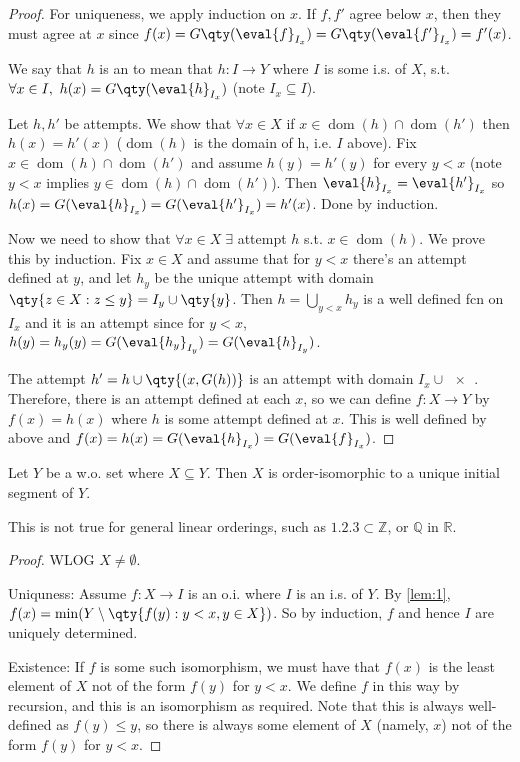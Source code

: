 \begin{proof}
    For uniqueness, we apply induction on $x$.
    If $f, f'$ agree below $x$, then they must agree at $x$ since $f(x) = G\qty(\eval{f}_{I_x}) = G\qty(\eval{f'}_{I_x}) = f'(x)$.

    We say that $h$ is an  to mean that $h \colon I \to Y$ where $I$ is some i.s. of $X$, s.t. $\forall x \in I,\ h(x) = G\qty(\eval{h}_{I_x})$ (note $I_x \subseteq I$).

    Let $h, h'$ be attempts.
    We show that $\forall x \in X$ if $x \in \operatorname{dom}(h) \cap \operatorname{dom}(h')$ then $h(x) = h'(x)$ ($\operatorname{dom}(h)$ is the domain of h, i.e. $I$ above).
    Fix $x \in \operatorname{dom}(h) \cap \operatorname{dom}(h')$ and assume $h(y) = h'(y)$ for every $y < x$ (note $y < x$ implies $y \in \operatorname{dom}(h) \cap \operatorname{dom}(h')$).
    Then $\eval{h}_{I_x} = \eval{h'}_{I_x}$ so $h(x) = G(\eval{h}_{I_x}) = G(\eval{h'}_{I_x}) = h'(x)$.
    Done by induction.

    Now we need to show that $\forall x \in X \; \exists$ attempt $h$ s.t. $x \in \operatorname{dom}(h)$.
    We prove this by induction.
    Fix $x \in X$ and assume that for $y < x$ there's an attempt defined at $y$, and let $h_y$ be the unique attempt with domain $\qty{z \in X : z \leq y} = I_y \cup \qty{y}$.
    Then $h = \bigcup_{y < x} h_y$ is a well defined fcn on $I_x$ and it is an attempt since for $y < x$, $h(y) = h_y(y) = G(\eval{h_y}_{I_y}) = G(\eval{h}_{I_y})$.

    The attempt $h' = h \cup \qty{(x, G(h))}$ is an attempt with domain $I_x \cup \qty{x}$.
    Therefore, there is an attempt defined at each $x$, so we can define $f \colon X \to Y$ by $f(x) = h(x)$ where $h$ is some attempt defined at $x$.
    This is well defined by above and $f(x) = h(x) = G(\eval{h}_{I_x}) = G(\eval{f}_{I_x})$.
\end{proof}

\begin{proposition} \label{prp:sbs}
    Let $Y$ be a w.o. set where $X \subseteq Y$.
    Then $X$ is order-isomorphic to a unique initial segment of $Y$.
\end{proposition}
This is not true for general linear orderings, such as $\qty{1, 2, 3} \subset \mathbb Z$, or $\mathbb Q$ in $\mathbb R$.
\begin{proof}
    WLOG $X \neq \emptyset$.

    Uniquness: Assume $f : X \to I$ is an o.i. where $I$ is an i.s. of $Y$.
    By \cref{lem:1}, $f(x) = \min(Y \setminus \qty{f(y) : y < x, y \in X})$.
    So by induction, $f$ and hence $I$ are uniquely determined.

    Existence:
    If $f$ is some such isomorphism, we must have that $f(x)$ is the least element of $X$ not of the form $f(y)$ for $y < x$.
    We define $f$ in this way by recursion, and this is an isomorphism as required.
    Note that this is always well-defined as $f(y) \leq y$, so there is always some element of $X$ (namely, $x$) not of the form $f(y)$ for $y < x$.
\end{proof}

